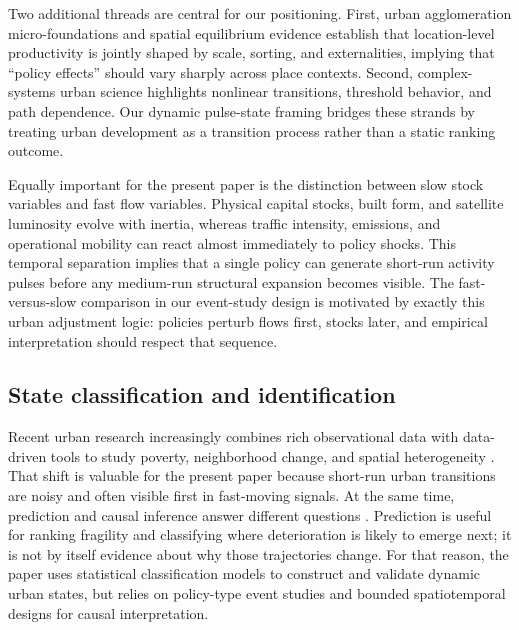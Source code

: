 \documentclass[11pt,a4paper]{article}
\begin{document}
Two additional threads are central for our positioning.
First, urban agglomeration micro-foundations and spatial equilibrium evidence \citep{duranton2004microfoundations,rosenthal2004evidence,glaeser2009wealth,ciccone1996productivity} establish that location-level productivity is jointly shaped by scale, sorting, and externalities, implying that ``policy effects'' should vary sharply across place contexts.
Second, complex-systems urban science \citep{batty2013newscience,west2017scale} highlights nonlinear transitions, threshold behavior, and path dependence.
Our dynamic pulse-state framing bridges these strands by treating urban development as a transition process rather than a static ranking outcome.

Equally important for the present paper is the distinction between slow stock variables and fast flow variables.
Physical capital stocks, built form, and satellite luminosity evolve with inertia, whereas traffic intensity, emissions, and operational mobility can react almost immediately to policy shocks.
This temporal separation implies that a single policy can generate short-run activity pulses before any medium-run structural expansion becomes visible.
The fast-versus-slow comparison in our event-study design is motivated by exactly this urban adjustment logic:
policies perturb flows first, stocks later, and empirical interpretation should respect that sequence.

\subsection{State classification and identification}
Recent urban research increasingly combines rich observational data with data-driven tools to study poverty, neighborhood change, and spatial heterogeneity \citep{jean2016combining,naik2017streetscore,gebru2017using}.
That shift is valuable for the present paper because short-run urban transitions are noisy and often visible first in fast-moving signals.
At the same time, prediction and causal inference answer different questions \citep{mullainathan2017machine,athey2019machine}.
Prediction is useful for ranking fragility and classifying where deterioration is likely to emerge next; it is not by itself evidence about why those trajectories change.
For that reason, the paper uses statistical classification models to construct and validate dynamic urban states, but relies on policy-type event studies and bounded spatiotemporal designs for causal interpretation.
\end{document}
